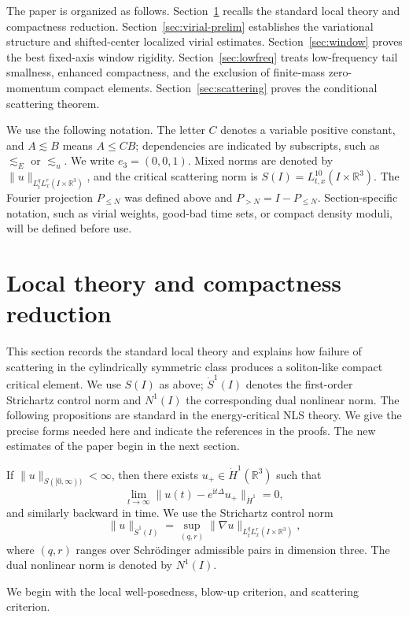 \documentclass[preprint,12pt]{elsarticle}
\numberwithin{equation}{section}
\newcommand{\R}{\mathbb R}
\newcommand{\ii}{\mathrm i}
\newcommand{\na}{\nabla}
\newcommand{\ez}{e_3}
\theoremstyle{remark}
\begin{document}
The paper is organized as follows.  Section~\ref{sec:local} recalls the standard local theory and compactness reduction.  Section~\ref{sec:virial-prelim} establishes the variational structure and shifted-center localized virial estimates.  Section~\ref{sec:window} proves the best fixed-axis window rigidity.  Section~\ref{sec:lowfreq} treats low-frequency tail smallness, enhanced compactness, and the exclusion of finite-mass zero-momentum compact elements.  Section~\ref{sec:scattering} proves the conditional scattering theorem.

We use the following notation.  The letter $C$ denotes a variable positive constant, and $A\lesssim B$ means $A\le CB$; dependencies are indicated by subscripts, such as $\lesssim_E$ or $\lesssim_u$.  We write $\ez=(0,0,1)$.  Mixed norms are denoted by $\|u\|_{L_t^qL_x^r(I\times\R^3)}$, and the critical scattering norm is $S(I)=L^{10}_{t,x}(I\times\R^3)$.  The Fourier projection $P_{\le N}$ was defined above and $P_{>N}=I-P_{\le N}$.  Section-specific notation, such as virial weights, good-bad time sets, or compact density moduli, will be defined before use.

\section{Local theory and compactness reduction}\label{sec:local}

This section records the standard local theory and explains how failure of scattering in the cylindrically symmetric class produces a soliton-like compact critical element.  We use $S(I)$ as above; $\dot S^1(I)$ denotes the first-order Strichartz control norm and $N^1(I)$ the corresponding dual nonlinear norm.  The following propositions are standard in the energy-critical NLS theory.  We give the precise forms needed here and indicate the references in the proofs.  The new estimates of the paper begin in the next section.

If $\|u\|_{S([0,\infty))}<\infty$, then there exists $u_+\in\dot H^1(\R^3)$ such that
\[
  \lim_{t\to\infty}\|u(t)-e^{\ii t\Delta}u_+\|_{\dot H^1}=0,
\]
and similarly backward in time.  We use the Strichartz control norm
\[
  \|u\|_{\dot S^1(I)}=
  \sup_{(q,r)}\|\na u\|_{L_t^qL_x^r(I\times\R^3)},
\]
where $(q,r)$ ranges over Schr\"odinger admissible pairs in dimension three.  The dual nonlinear norm is denoted by $N^1(I)$.

We begin with the local well-posedness, blow-up criterion, and scattering criterion.
\end{document}
